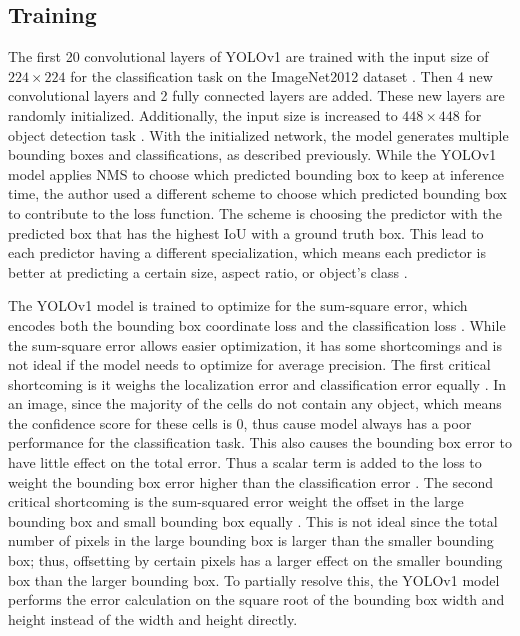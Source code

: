 \subsection{Training}
The first 20 convolutional layers of YOLOv1 are trained with the input size of $224 \times 224$ for the classification task on the ImageNet2012 dataset \cite{ImageNet_dataset}. Then 4 new convolutional layers and 2 fully connected layers are added. These new layers are randomly initialized. Additionally, the input size is increased to $448 \times 448$ for object detection task \cite{yolov1_2016}. With the initialized network, the model generates multiple bounding boxes and classifications, as described previously. While the YOLOv1 model applies NMS to choose which predicted bounding box to keep at inference time, the author used a different scheme to choose which predicted bounding box to contribute to the loss function. The scheme is choosing the predictor with the predicted box that has the highest IoU with a ground truth box. This lead to each predictor having a different specialization, which means each predictor is better at predicting a certain size, aspect ratio, or object's class \cite{yolov1_2016}.

The YOLOv1 model is trained to optimize for the sum-square error, which encodes both the bounding box coordinate loss and the classification loss \cite{yolov1_2016}. While the sum-square error allows easier optimization, it has some shortcomings and is not ideal if the model needs to optimize for average precision. The first critical shortcoming is it weighs the localization error and classification error equally \cite{yolov1_2016}. In an image, since the majority of the cells do not contain any object, which means the confidence score for these cells is 0, thus cause model always has a poor performance for the classification task. This also causes the bounding box error to have little effect on the total error. Thus a scalar term is added to the loss to weight the bounding box error higher than the classification error \cite{yolov1_2016}. The second critical shortcoming is the sum-squared error weight the offset in the large bounding box and small bounding box equally \cite{yolov1_2016}. This is not ideal since the total number of pixels in the large bounding box is larger than the smaller bounding box; thus, offsetting by certain pixels has a larger effect on the smaller bounding box than the larger bounding box. To partially resolve this, the YOLOv1 model performs the error calculation on the square root of the bounding box width and height instead of the width and height directly.